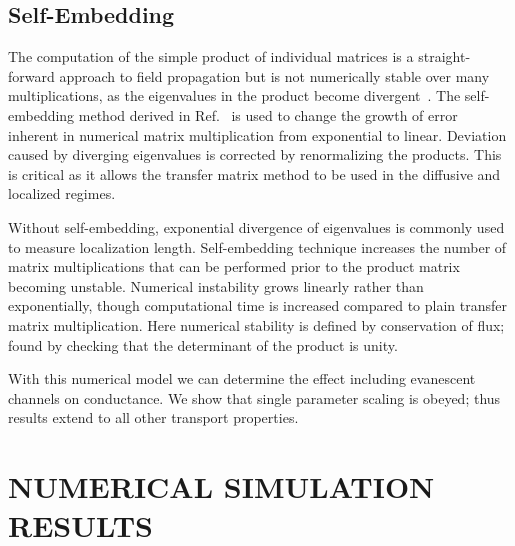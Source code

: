 \subsection{Self-Embedding}

The computation of the simple product of individual matrices is a straight-forward approach to field propagation but is not numerically stable over many multiplications, as the eigenvalues in the product become divergent~\cite{1968_Osedelec}. 
The self-embedding method derived in Ref.~
is used to change the growth of error inherent in numerical matrix multiplication from exponential to linear. Deviation caused by diverging eigenvalues is corrected by renormalizing the products. This is critical as it allows the transfer matrix method to be used in the diffusive and localized regimes. 

Without self-embedding, exponential divergence of eigenvalues is commonly used to measure localization length. 
Self-embedding technique increases the number of matrix multiplications that can be performed prior to the product matrix becoming unstable. Numerical instability grows linearly rather than exponentially, though computational time is increased compared to plain transfer matrix multiplication.  Here numerical stability is defined by conservation of flux; found by checking that the determinant of the product is unity.

With this numerical model we can determine the effect including evanescent channels on conductance. We show that single parameter scaling is obeyed; thus results extend to all other transport properties.


\section{NUMERICAL SIMULATION RESULTS}
\label{sec:numericalResults}
%

